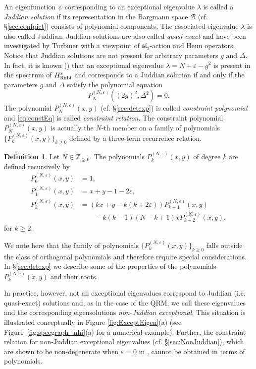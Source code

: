 \documentclass[11pt]{article}
\numberwithin{equation}{section}
\newcommand{\Z}{\mathbb{Z}} %
\newcommand{\e}{\varepsilon}
\newcommand{\HRabi}[1]{H_{\text{\upshape Rabi}}^{#1}} %
\newcommand{\cp}[2]{P^{(#1)}_{#2}} %
\newcommand{\Bargmann}{\mathcal{B}}
\theoremstyle{plain}
\theoremstyle{definition}
\newtheorem{dfn}{Definition}[section]
\theoremstyle{remark}
\begin{document}
An eigenfunction \(\psi\) corresponding to an exceptional eigenvalue \(\lambda\) is called a
{\em Juddian solution} if its representation in the Bargmann space \(\Bargmann\) (cf. \S\ref{sec:confpict}) consists of polynomial components.
The associated eigenvalue \(\lambda\) is also called Juddian. Juddian solutions are also called {\em quasi-exact} and
have been investigated by Turbiner \cite{T1988CMP} with a viewpoint of $\mathfrak{sl}_2$-action and Heun operators.
Notice that Juddian solutions are not present for arbitrary
parameters \(g\) and \(\Delta\). In fact, it is known (\cite{LB2016JPA,WY2014JPA}) that an exceptional eigenvalue \(\lambda = N + \e - g^2 \) is present in the spectrum of $\HRabi{\e}$ and corresponds to a Juddian solution if and only if the parameters \(g\) and \(\Delta\) satisfy the polynomial equation
\begin{equation}
  \label{eq:constEq}
  \cp{N,\e}{N}((2g)^2,\Delta^2) = 0.
\end{equation}
The polynomial \(\cp{N,\e}{N}(x,y)\) (cf. \S \ref{sec:detexp}) is called {\em constraint polynomial} and
\eqref{eq:constEq} is called {\em constraint relation}. 
  The constraint polynomial \(\cp{N,\e}{N}(x,y)\) is actually the $N$-th member on a family of polynomials
  \(\{\cp{N,\e}{k}(x,y)\}_{k \geq 0}\) defined by a three-term recurrence relation.
\begin{dfn} \label{def:cp}
  Let $ N \in \Z_{\geq 0}$. The polynomials \(\cp{N,\e}{k}(x,y)\) of degree $k$ are defined
  recursively by
\begin{align*}
  \cp{N,\e}{0}(x,y) &= 1, \\
  \cp{N,\e}{1}(x,y) &= x + y - 1 - 2 \e, \\
  \cp{N,\e}{k}(x,y) &= (k x + y - k(k + 2 \e) ) P_{k-1}^{(N,\e)}(x,y) \\
                    &\qquad  - k(k-1)(N-k+1) x P_{k-2}^{(N,\e)}(x,y),
\end{align*}
for \(k \geq 2 \).
\end{dfn}
We note here that the family of polynomials \(\{\cp{N,\e}{k}(x,y)\}_{k \geq 0}\) falls outside the class of orthogonal
polynomials and therefore require special considerations. In \S \ref{sec:detexp} we describe some of the properties of the polynomials \(\cp{N,\e}{k}(x,y)\) and their roots.


In practice, however, not all exceptional eigenvalues correspond to Juddian (i.e. quasi-exact) solutions and, as in the case of the QRM, we call these eigenvalues and the corresponding eigensolutions {\em non-Juddian exceptional}.
This situation is illustrated conceptually in Figure \ref{fig:ExceptEigen}(a) (see Figure~\ref{fig:specgraph_nhi}(a) for a numerical example).
Further, the constraint relation for non-Juddian exceptional eigenvalues (cf. \S \ref{sec:NonJuddian}), which are shown to be non-degenerate
when $\e=0$ in \cite{B2013MfI}, cannot be obtained in terms of polynomials.
\end{document}
